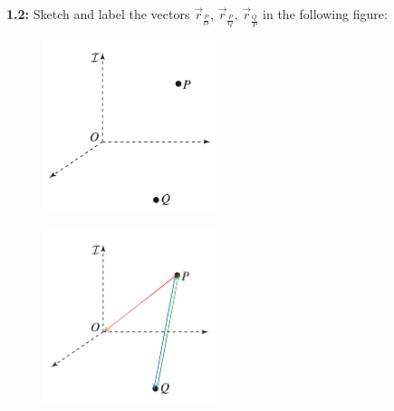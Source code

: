 \begin{homeworkProblem}

	\textbf{1.2:} Sketch and label the vectors \( \vec{r}_{\frac{P}{O}} \), \( \vec{r}_{\frac{P}{Q}} \), \( \vec{r}_{\frac{Q}{P}} \) in the following figure:

	\begin{figure}[ht]
		\begin{center}
			\includegraphics[width=0.45\textwidth]{images/p2.png}
		\end{center}
	\end{figure}

	\solution

	\begin{figure}[ht]
		\begin{center}
			\includegraphics[width=0.45\textwidth]{images/s2.png}
		\end{center}
	\end{figure}

\end{homeworkProblem}

